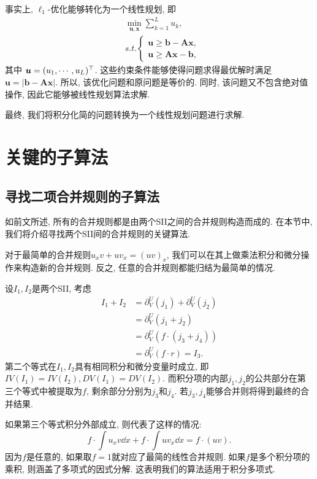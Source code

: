 事实上, $\ell_1$-优化能够转化为一个线性规划\citep[pp. 195--196]{L1_regression}, 即
\begin{equation}
\begin{split}
&\underset{\bm u,\bm x}\min \sum_{k=1}^L{u_k},\\
&s.t. \left\{
\begin{matrix}
\bm{u}\ge \bm{b}-\bm{A}\bm{x},\\ 
\bm{u}\ge \bm{A}\bm{x}-\bm{b},
\end{matrix}
\right.
\end{split}
\label{LP}
\end{equation}
其中 $\bm u=(u_1,\cdots,u_L)^\top$. 这些约束条件能够使得问题求得最优解时满足$\bm u = |\bm{b}-\bm{A}\bm{x}|$. 所以, 该优化问题和原问题是等价的. 同时, 该问题又不包含绝对值操作, 因此它能够被线性规划算法求解. 

最终, 我们将积分化简的问题转换为一个线性规划问题进行求解.

\section{关键的子算法} \label{Details-03}
\subsection{寻找二项合并规则的子算法} \label{Combine-03}
如前文所述, 所有的合并规则都是由两个SII之间的合并规则构造而成的. 在本节中, 我们将介绍寻找两个SII间的合并规则的关键算法. 

对于最简单的合并规则$u_x v + u v_x = (uv)_x$, 我们可以在其上做乘法\D 积分和微分操作来构造新的合并规则. 反之, 任意的合并规则都能归结为最简单的情况. 

设$I_1,I_2$是两个SII, 考虑 
\begin{equation}
\begin{split}
I_1+I_2 &= \partial^U_V(j_1) + \partial^U_V(j_2) \\
        &= \partial^U_V( j_1+j_2 )\\
        &= \partial^U_V( f\cdot(j_3+j_4) )\\ 
        &= \partial^U_V( f\cdot r ) = I_3 .
\end{split}
\label{combine_form}
\end{equation} 
第二个等式在$I_1,I_2$具有相同积分和微分变量时成立, 即$IV(I_1)=IV(I_2),DV(I_1)=DV(I_2)$. 而积分项的内部$j_1,j_2$的公共部分在第三个等式中被提取为$f$, 剩余部分分别为$j_3$和$j_4$. 若$j_3,j_4$能够合并则将得到最终的合并结果. 

如果第三个等式积分外部成立, 则代表了这样的情况: 
\begin{equation}
f\cdot\int\!{u_x v\dd x}+f\cdot\int\!{u v_x \dd x} = f\cdot(uv).
\end{equation} 
因为$f$是任意的, 如果取$f=1$就对应了最简的线性合并规则. 如果$f$是多个积分项的乘积, 则涵盖了多项式的因式分解. 这表明我们的算法适用于积分多项式. 

